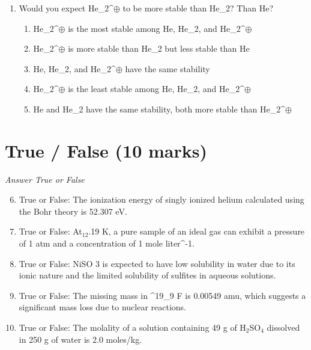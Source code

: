 \documentclass[12pt]{article}
\begin{document}
\begin{enumerate}[label=\arabic*.]
\begin{enumerate}[label=(\alph*)]
    \item .3582 : .4582 : .0582
    \item .2582 : .4998 : .3092
    \item .1582 : .6008 : .2092
    \item .1582 : .4998 : .1092
\end{enumerate}
\item Would you expect He\_2^\ensuremath{\oplus} to be more stable than He\_2? Than He?
\begin{enumerate}[label=(\alph*)]
    \item He\_2^\ensuremath{\oplus} is the most stable among He, He\_2, and He\_2^\ensuremath{\oplus}
    \item He\_2^\ensuremath{\oplus} is more stable than He\_2 but less stable than He
    \item He, He\_2, and He\_2^\ensuremath{\oplus} have the same stability
    \item He\_2^\ensuremath{\oplus} is the least stable among He, He\_2, and He\_2^\ensuremath{\oplus}
    \item He and He\_2 have the same stability, both more stable than He\_2^\ensuremath{\oplus}
\end{enumerate}
\end{enumerate}

\section*{True / False (10 marks)}
\textit{Answer True or False}
\begin{enumerate}[label=\arabic*.]
\setcounter{enumi}{5}
\item True or False: The ionization energy of singly ionized helium calculated using the Bohr theory is 52.307 eV.
\item True or False: At$_{12}$.19 K, a pure sample of an ideal gas can exhibit a pressure of 1 atm and a concentration of 1 mole liter^-1.
\item True or False: NiSO 3 is expected to have low solubility in water due to its ionic nature and the limited solubility of sulfites in aqueous solutions.
\item True or False: The missing mass in ^19\_9 F is 0.00549 amu, which suggests a significant mass loss due to nuclear reactions.
\item True or False: The molality of a solution containing 49 g of H$_{2}$SO$_{4}$ dissolved in 250 g of water is 2.0 moles/kg.
\end{enumerate}
\end{document}
